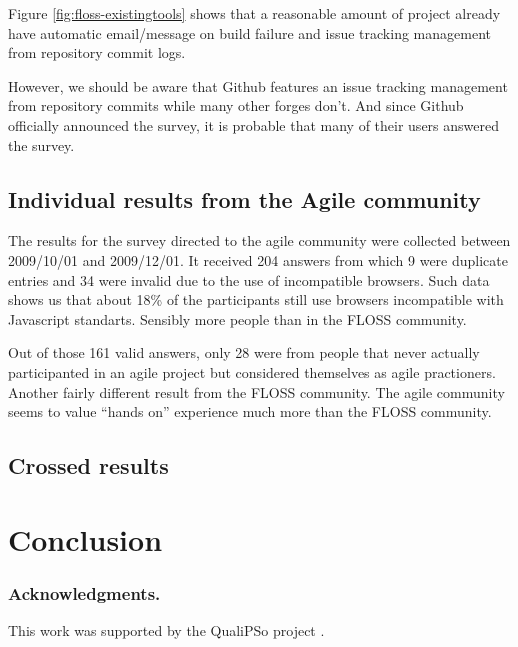 \documentclass[lnbip]{svmultln}
\begin{document}
Figure \ref{fig:floss-existingtools} shows that a reasonable amount of
project already have automatic email/message on build failure and
issue tracking management from repository commit logs.

However, we should be aware that Github features an issue tracking
management from repository commits while many other forges don't. And
since Github officially announced the survey, it is probable that many
of their users answered the survey.

\subsection{Individual results from the Agile community}
\label{subsec:agile-results}

The results for the survey directed to the agile community were
collected between 2009/10/01 and 2009/12/01. It received 204 answers
from which 9 were duplicate entries and 34 were invalid due to the use
of incompatible browsers. Such data shows us that about 18\% of the
participants still use browsers incompatible with Javascript
standarts. Sensibly more people than in the FLOSS community.

Out of those 161 valid answers, only 28 were from people that never
actually participanted in an agile project but considered themselves
as agile practioners. Another fairly different result from the FLOSS
community. The agile community seems to value ``hands on'' experience
much more than the FLOSS community.




\subsection{Crossed results}
\label{subsec:crossed-results}

\section{Conclusion}
\label{sec:conclusion}


\subsubsection*{Acknowledgments.}

This work was supported by the QualiPSo project \cite{url:qualipso}.
\end{document}
